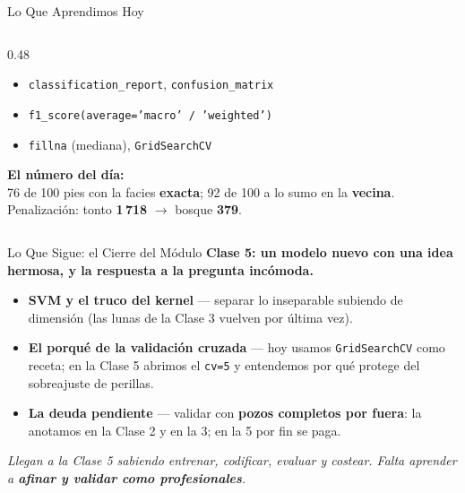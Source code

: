 \documentclass[aspectratio=169, 11pt]{beamer}
\begin{document}
\begin{frame}[shrink=8]{Lo Que Aprendimos Hoy}
\begin{columns}[T]
\begin{column}{0.48\textwidth}
{\begin{itemize}
        \item[{\color{arcaRed}\scriptsize\faTools}]
          \texttt{classification\_report}, \texttt{confusion\_matrix}
        \item[{\color{arcaRed}\scriptsize\faTools}]
          \texttt{f1\_score(average='macro' / 'weighted')}
        \item[{\color{arcaRed}\scriptsize\faTools}]
          \texttt{fillna} (mediana), \texttt{GridSearchCV}
      \end{itemize}
      }
      \vspace{8pt}
      \begin{tcolorbox}[colback=arcaGray, colframe=arcaRed, boxrule=0pt, leftrule=3pt,
        arc=3pt, left=6pt, right=6pt, top=5pt, bottom=5pt]
        {\scriptsize\color{arcaDark}\bfseries El número del día:}\\[3pt]
        {\scriptsize\color{textMuted}
          76 de 100 pies con la facies \textbf{exacta};
          92 de 100 a lo sumo en la \textbf{vecina}.
          Penalización: tonto \textbf{1\,718} \(\to\) bosque
          \textbf{379}.}
      \end{tcolorbox}
    \end{column}
  \end{columns}
\end{frame}

\begin{frame}{Lo Que Sigue: el Cierre del Módulo}
  \vspace{-6pt}
  {\small\color{arcaDark}\bfseries
    Clase 5: un modelo nuevo con una idea hermosa, y la respuesta a la pregunta incómoda.}

  \vspace{10pt}
  {\footnotesize
  \begin{itemize}\setlength{\itemsep}{7pt}
    \item[{\color{arcaRed}\Large\faArrowCircleRight}]
      \textbf{SVM y el truco del kernel} --- separar lo inseparable subiendo de
      dimensión (las lunas de la Clase 3 vuelven por última vez).

    \item[{\color{arcaRed}\Large\faArrowCircleRight}]
      \textbf{El porqué de la validación cruzada} --- hoy usamos
      \texttt{GridSearchCV} como receta; en la Clase 5 abrimos el \texttt{cv=5}
      y entendemos por qué protege del sobreajuste de perillas.

    \item[{\color{arcaRed}\Large\faArrowCircleRight}]
      \textbf{La deuda pendiente} --- validar con \textbf{pozos completos por fuera}:
      la anotamos en la Clase 2 y en la 3; en la 5 por fin se paga.
  \end{itemize}
  }

  \vspace{10pt}
  \centering
  {\footnotesize\color{arcaDark}\itshape
    Llegan a la Clase 5 sabiendo entrenar, codificar, evaluar y costear.
    Falta aprender a \textbf{afinar y validar como profesionales}.}
\end{frame}
\end{document}
